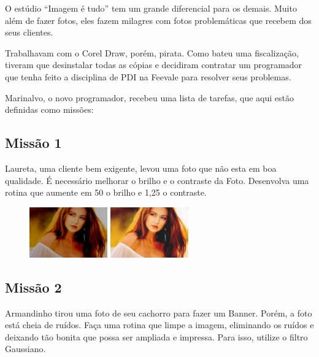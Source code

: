 \documentclass[
	12pt,				%
	oneside,			%
	a4paper,			%
	english,			%
	french,				%
	spanish,			%
	brazil,				%
	]{abntex2}
\begin{document}
\begin{apendicesenv}
O estúdio “Imagem é tudo” tem um grande diferencial para os demais. Muito além de fazer fotos, eles fazem milagres com fotos problemáticas que recebem dos seus clientes. 

Trabalhavam com o Corel Draw, porém, pirata. Como bateu uma fiscalização, tiveram que desinstalar todas as cópias e decidiram contratar um programador que tenha feito a disciplina de PDI na Feevale para resolver seus problemas. 

Marinalvo, o novo programador, recebeu uma lista de tarefas, que aqui estão definidas como missões:


\subsection{Missão 1}

Laureta, uma cliente bem exigente, levou uma foto que não esta em boa qualidade. É necessário melhorar o brilho e o contraste da Foto. Desenvolva uma rotina que aumente em 50 o brilho e 1,25 o contraste.

\begin{figure}[H]
\centering
\includegraphics[width=0.3\textwidth]{imagens/desafioestudio/mission1_input.jpg}
\includegraphics[width=0.3\textwidth]{imagens/desafioestudio/mission1_output.png}
\end{figure}

\subsection{Missão 2}

Armandinho tirou uma foto de seu cachorro para fazer um Banner. Porém, a foto está cheia de ruídos. Faça uma rotina que limpe a imagem, eliminando os ruídos e deixando tão bonita que possa ser ampliada e impressa. Para isso, utilize o filtro Gaussiano.


\end{apendicesenv}
\end{document}
